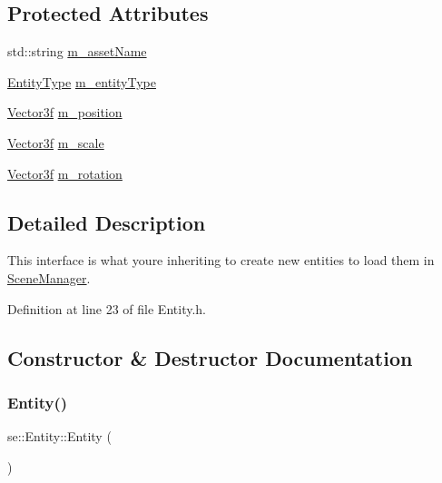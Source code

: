 \subsection*{Protected Attributes}
\begin{DoxyCompactItemize}
\item 
std\+::string \mbox{\hyperlink{classse_1_1_entity_aba1f7cc3700caee65b20c423185ab7ca}{m\+\_\+asset\+Name}}
\item 
\mbox{\hyperlink{namespacese_ae73a909a94998bc95235eb9b16e405f1}{Entity\+Type}} \mbox{\hyperlink{classse_1_1_entity_ac5d4a145ef27824a21ea1a4cb7a63e6c}{m\+\_\+entity\+Type}}
\item 
\mbox{\hyperlink{namespacese_a12e07512d95e2fdebdaf74a5ea2cf5f6}{Vector3f}} \mbox{\hyperlink{classse_1_1_entity_ad59d1f9af185f480cd028db43d4ad0f2}{m\+\_\+position}}
\item 
\mbox{\hyperlink{namespacese_a12e07512d95e2fdebdaf74a5ea2cf5f6}{Vector3f}} \mbox{\hyperlink{classse_1_1_entity_a9c2c8636093982abc56960b947958b34}{m\+\_\+scale}}
\item 
\mbox{\hyperlink{namespacese_a12e07512d95e2fdebdaf74a5ea2cf5f6}{Vector3f}} \mbox{\hyperlink{classse_1_1_entity_ad1cfc08dd4df9fe2a2633a6c2cd3e402}{m\+\_\+rotation}}
\end{DoxyCompactItemize}


\subsection{Detailed Description}
This interface is what you\textquotesingle{}re inheriting to create new entities to load them in \mbox{\hyperlink{classse_1_1_scene_manager}{Scene\+Manager}}. 

Definition at line 23 of file Entity.\+h.



\subsection{Constructor \& Destructor Documentation}
\mbox{\label{classse_1_1_entity_ac92492302d50c22ba7c4e9ff016b6145}} 
\subsubsection{\texorpdfstring{Entity()}{Entity()}}
{\footnotesize\ttfamily se\+::\+Entity\+::\+Entity (\begin{DoxyParamCaption}{ }\end{DoxyParamCaption})}



